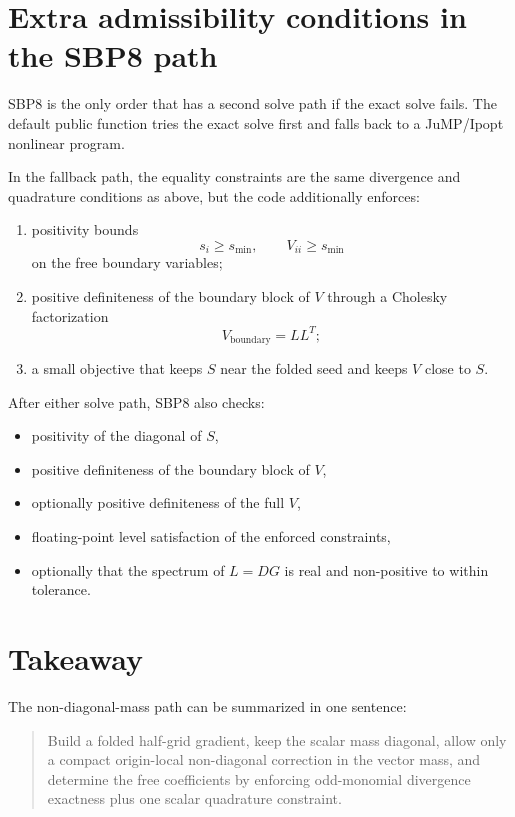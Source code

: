 \documentclass[
  aps,
  pre,
  reprint,
  superscriptaddress,
  nofootinbib
]{revtex4-2}
\begin{document}
\section{Extra admissibility conditions in the SBP8 path}
SBP8 is the only order that has a second solve path if the exact solve fails.
The default public function tries the exact solve first and falls back to a
JuMP/Ipopt nonlinear program.

In the fallback path, the equality constraints are the same divergence and quadrature
conditions as above, but the code additionally enforces:
\begin{enumerate}
  \item positivity bounds
  \begin{equation}
    s_i \ge s_{\min}, \qquad V_{ii} \ge s_{\min}
  \end{equation}
  on the free boundary variables;
  \item positive definiteness of the boundary block of $V$ through a Cholesky
  factorization
  \begin{equation}
    V_{\mathrm{boundary}} = L L^T;
  \end{equation}
  \item a small objective that keeps $S$ near the folded seed and keeps $V$ close to $S$.
\end{enumerate}

After either solve path, SBP8 also checks:
\begin{itemize}
  \item positivity of the diagonal of $S$,
  \item positive definiteness of the boundary block of $V$,
  \item optionally positive definiteness of the full $V$,
  \item floating-point level satisfaction of the enforced constraints,
  \item optionally that the spectrum of $L = D G$ is real and non-positive to within
  tolerance.
\end{itemize}

\section{Takeaway}
The non-diagonal-mass path can be summarized in one sentence:
\begin{quote}
Build a folded half-grid gradient, keep the scalar mass diagonal, allow only a compact
origin-local non-diagonal correction in the vector mass, and determine the free
coefficients by enforcing odd-monomial divergence exactness plus one scalar quadrature
constraint.
\end{quote}
\end{document}
